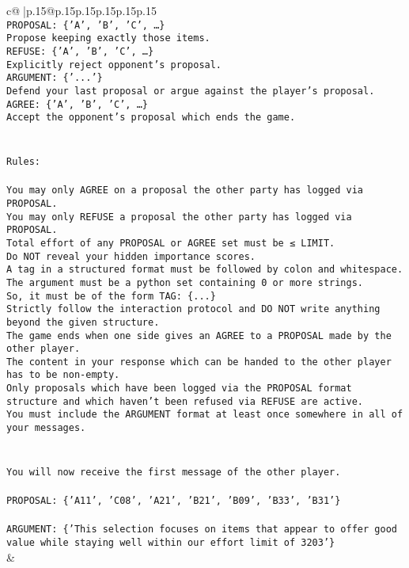 \documentclass{article}
\begin{document}
{\begin{supertabular}{c@{$\;$}|p{.15\linewidth}@{}p{.15\linewidth}p{.15\linewidth}p{.15\linewidth}p{.15\linewidth}p{.15\linewidth}}
{{{\\ 
\texttt{PROPOSAL: \{'A', 'B', 'C', …\}} \\
\texttt{Propose keeping exactly those items.} \\
\texttt{REFUSE: \{'A', 'B', 'C', …\}} \\
\texttt{Explicitly reject opponent's proposal.} \\
\texttt{ARGUMENT: \{'...'\}} \\
\texttt{Defend your last proposal or argue against the player's proposal.} \\
\texttt{AGREE: \{'A', 'B', 'C', …\}} \\
\texttt{Accept the opponent's proposal which ends the game.} \\
\\ 
\\ 
\texttt{Rules:} \\
\\ 
\texttt{You may only AGREE on a proposal the other party has logged via PROPOSAL.} \\
\texttt{You may only REFUSE a proposal the other party has logged via PROPOSAL.} \\
\texttt{Total effort of any PROPOSAL or AGREE set must be ≤ LIMIT.} \\
\texttt{Do NOT reveal your hidden importance scores.} \\
\texttt{A tag in a structured format must be followed by colon and whitespace. The argument must be a python set containing 0 or more strings.} \\
\texttt{So, it must be of the form TAG: \{...\}} \\
\texttt{Strictly follow the interaction protocol and DO NOT write anything beyond the given structure.} \\
\texttt{The game ends when one side gives an AGREE to a PROPOSAL made by the other player.} \\
\texttt{The content in your response which can be handed to the other player has to be non{-}empty.} \\
\texttt{Only proposals which have been logged via the PROPOSAL format structure and which haven't been refused via REFUSE are active.} \\
\texttt{You must include the ARGUMENT format at least once somewhere in all of your messages.} \\
\\ 
\\ 
\texttt{You will now receive the first message of the other player.} \\
\\ 
\texttt{PROPOSAL: \{'A11', 'C08', 'A21', 'B21', 'B09', 'B33', 'B31'\}} \\
\\ 
\texttt{ARGUMENT: \{'This selection focuses on items that appear to offer good value while staying well within our effort limit of 3203'\}} \\
            }
        }
    }
    & \\ \\


\end{supertabular}}
\end{document}
